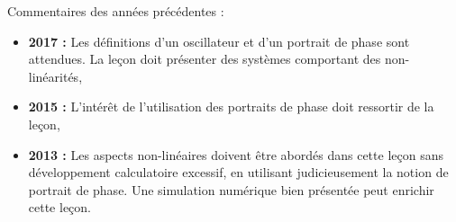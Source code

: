\begin{reportBlock}{Commentaires des années précédentes :}
    \begin{itemize}
        \item \textbf{2017 :} Les définitions d’un oscillateur et d’un portrait de phase sont attendues. La leçon doit présenter des systèmes comportant des non-linéarités,
        \item \textbf{2015 :} L’intérêt de l’utilisation des portraits de phase doit ressortir de la leçon,
        \item \textbf{2013 :} Les aspects non-linéaires doivent être abordés dans cette leçon sans développement calculatoire excessif, en utilisant judicieusement la notion de portrait de phase. Une simulation numérique bien présentée peut enrichir cette leçon.
    \end{itemize}
\end{reportBlock}

